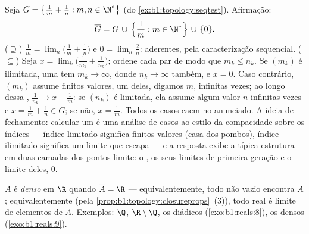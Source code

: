 \begin{example}\label{ex:b1:topology:closurecomputed}
Seja $G = \bigl\{\frac1m + \frac1n : m, n \in \N^*\bigr\}$ (do
\cref{ex:b1:topology:seqtest}). Afirmação:
\[
\overline G = G \,\cup\, \Bigl\{\frac1m : m \in \N^*\Bigr\}
\,\cup\, \{0\} .
\]
($\supseteq$) $\frac1m = \lim_n \bigl(\frac1m + \frac1n\bigr)$
e $0 = \lim_n \frac2n$: aderentes, pela caracterização
sequencial. ($\subseteq$) Seja $x = \lim_k \bigl(
\frac{1}{m_k} + \frac{1}{n_k}\bigr)$; ordene cada par de modo que
$m_k \leq n_k$. Se $(m_k)$ é ilimitada, uma  tem $m_k
\to \infty$, donde $n_k \to \infty$ também, e $x = 0$. Caso contrário,
$(m_k)$ assume finitos valores, um deles, digamos $m$,
infinitas vezes; ao longo dessa , $\frac{1}{n_k} \to x -
\frac1m$: se $(n_k)$ é limitada, ela assume algum valor $n$
infinitas vezes e $x = \frac1m + \frac1n \in G$; se não, $x =
\frac1m$. Todos os casos caem no  anunciado. A ideia de
fechamento: calcular um  é uma análise de casos ao estilo da
compacidade sobre os índices --- índice limitado significa finitos
valores (casa dos pombos), índice ilimitado significa um limite que
escapa --- e a resposta exibe a típica estrutura em duas camadas dos
pontos-limite: o , os seus limites de primeira geração e o
limite deles, $0$.
\end{example}

\begin{definition}\label{def:b1:topology:dense}
$A$ é \emph{denso} em $\R$ quando $\overline A = \R$
--- equivalentemente, todo   não vazio encontra $A$;
equivalentemente (pela \cref{prop:b1:topology:closureprops}~(3)), todo
real é limite de elementos de $A$. Exemplos: $\Q$, $\R \setminus
\Q$,
os diádicos (\cref{exo:b1:reals:8}), os  densos
(\cref{exo:b1:reals:9}).
\end{definition}

